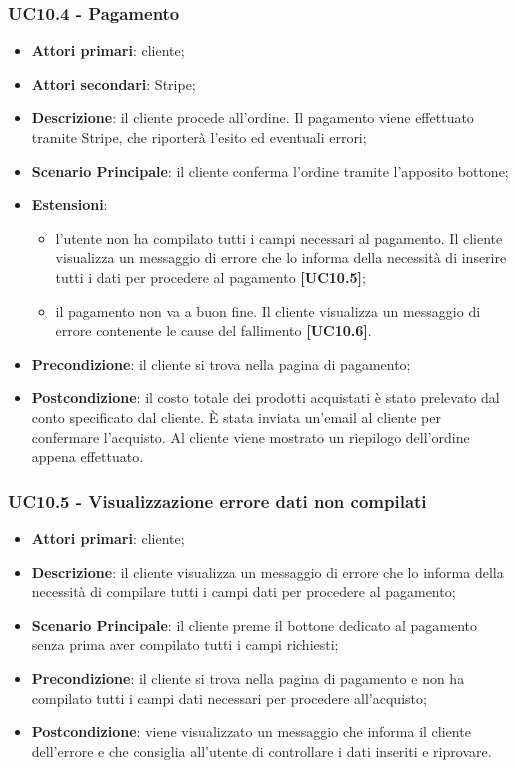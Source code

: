 \subsubsection{UC10.4 - Pagamento}
\begin{itemize}
\item \textbf{Attori primari}: cliente;
\item \textbf{Attori secondari}: Stripe;
\item \textbf{Descrizione}: il cliente procede all'ordine. Il pagamento viene effettuato tramite Stripe, che riporterà l'esito ed eventuali errori;
\item \textbf{Scenario Principale}: il cliente conferma l'ordine tramite l'apposito bottone;
\item \textbf{Estensioni}:
\begin{itemize}
	\item l'utente non ha compilato tutti i campi necessari al pagamento. Il cliente visualizza un messaggio di errore che lo informa della necessità di inserire tutti i dati per procedere al pagamento \textbf{[UC10.5]};
	\item il pagamento non va a buon fine. Il cliente visualizza un messaggio di errore contenente le cause del fallimento \textbf{[UC10.6]}.
\end{itemize}
\item \textbf{Precondizione}: il cliente si trova nella pagina di pagamento;
\item \textbf{Postcondizione}: il costo totale dei prodotti acquistati è stato prelevato dal conto specificato dal cliente. È stata inviata un'email al cliente per confermare l'acquisto. Al cliente viene mostrato un riepilogo dell'ordine appena effettuato.
\end{itemize}

\subsubsection{UC10.5 - Visualizzazione errore dati non compilati}
\begin{itemize}
\item \textbf{Attori primari}: cliente;
\item \textbf{Descrizione}: il cliente visualizza un messaggio di errore che lo informa della necessità di compilare tutti i campi dati per procedere al pagamento;
\item \textbf{Scenario Principale}: il cliente preme il bottone dedicato al pagamento senza prima aver compilato tutti i campi richiesti;
\item \textbf{Precondizione}: il cliente si trova nella pagina di pagamento e non ha compilato tutti i campi dati necessari per procedere all'acquisto;
\item \textbf{Postcondizione}: viene visualizzato un messaggio che informa il cliente dell'errore e che consiglia all'utente di controllare i dati inseriti e riprovare.
\end{itemize}


